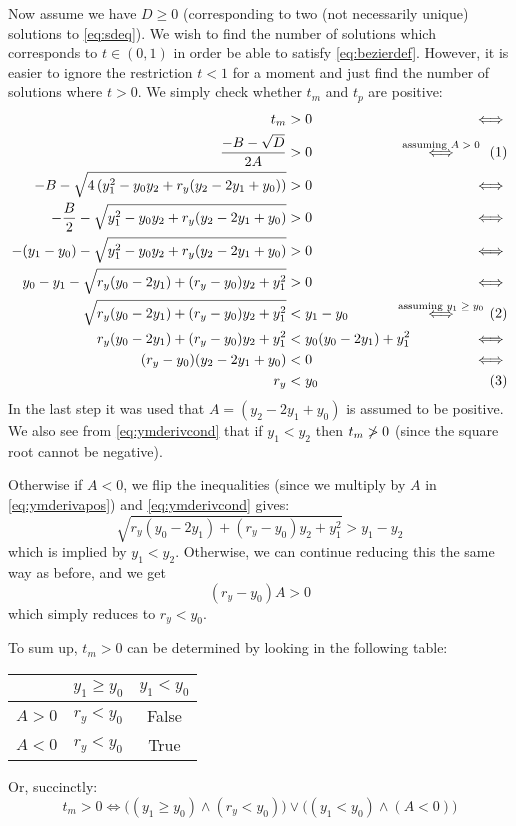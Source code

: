 \documentclass[11pt, a4paper]{article}
\newcommand{\numberhere}{\stepcounter{equation}\tag{\theequation}}
\begin{document}
Now assume we have $D \geq 0$ (corresponding to two (not necessarily unique) solutions to \eqref{eq:sdeq}). We wish to find the number of solutions which corresponds to $t \in (0, 1)$ in order be able to satisfy \eqref{eq:bezierdef}. However, it is easier to ignore the restriction $t<1$ for a moment and just find the number of solutions where $t > 0$. We simply check whether $t_m$ and $t_p$ are positive:
\begin{align*}
t_m &> 0 & \iff\\
\frac{-B-\sqrt{D}}{2A} &> 0 &\overset{\mathclap{\text{assuming $A > 0$}}}\iff\numberhere\label{eq:ymderivapos}\\
-B-\sqrt{4\left(y_1^2 - y_0y_2 + r_y(y_2 - 2y_1 + y_0)\right)} &> 0 & \iff\\
-\frac B2 - \sqrt{y_1^2 - y_0y_2 + r_y(y_2 - 2y_1 + y_0)} &> 0 & \iff\\
-(y_1-y_0)-\sqrt{y_1^2 - y_0y_2 + r_y(y_2 - 2y_1 + y_0)} &> 0 & \iff\\
y_0-y_1-\sqrt{r_y(y_0-2y_1)+(r_y-y_0)y_2+y_1^2} &> 0 & \iff\\
\sqrt{r_y(y_0-2y_1)+(r_y-y_0)y_2+y_1^2} &< y_1-y_0 & \overset{\mathclap{\text{assuming $y_1\geq y_0$}}}\iff\numberhere\label{eq:ymderivcond}\\
r_y(y_0-2y_1)+(r_y-y_0)y_2+y_1^2 &< y_0(y_0-2y_1)+y_1^2 &\iff\\
(r_y-y_0)(y_2-2y_1+y_0) &< 0 &\iff\\
r_y &< y_0&\numberhere\label{eq:ymderivend}
\end{align*}
In the last step it was used that $A=(y_2-2y_1+y_0)$ is assumed to be positive. We also see from \eqref{eq:ymderivcond} that if $y_1 < y_2$ then $t_m \centernot> 0$ (since the square root cannot be negative).

Otherwise if $A < 0$, we flip the inequalities (since we multiply by $A$ in \eqref{eq:ymderivapos}) and \eqref{eq:ymderivcond} gives:
\begin{equation*}
\sqrt{r_y(y_0-2y_1)+(r_y-y_0)y_2+y_1^2} > y_1-y_2
\end{equation*}
which is implied by $y_1 < y_2$. Otherwise, we can continue reducing this the same way as before, and we get
\begin{equation*}
(r_y-y_0)A > 0
\end{equation*}
which simply reduces to $r_y < y_0$.

To sum up, $t_m > 0$ can be determined by looking in the following table:
\begin{table}[H]
\centering
\begin{tabular}{c|c|c}
& $y_1 \geq y_0$ & $y_1 < y_0$ \\\hline
$A > 0$ & $r_y < y_0$ & False\\\hline
$A < 0$ & $r_y < y_0 $ & True
\end{tabular}
\end{table}
Or, succinctly:
\begin{equation*}
t_m > 0 \iff \big((y_1 \geq y_0) \land (r_y < y_0)\big) \lor \big((y_1 < y_0) \land (A < 0)\big)
\end{equation*}
\end{document}
